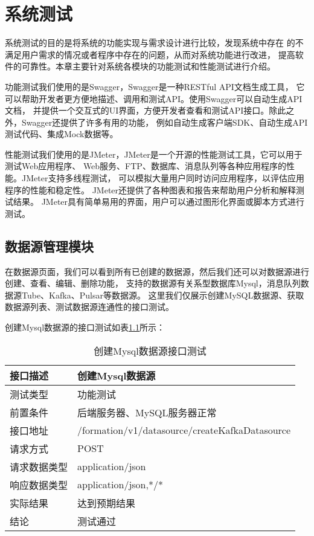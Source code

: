 
\chapter{系统测试}

系统测试的目的是将系统的功能实现与需求设计进行比较，发现系统中存在
的不满足用户需求的情况或者程序中存在的问题，从而对系统功能进行改进，
提高软件的可靠性。本章主要针对系统各模块的功能测试和性能测试进行介绍\cite{32}。

功能测试我们使用的是Swagger，Swagger是一种RESTful API文档生成工具，
它可以帮助开发者更方便地描述、调用和测试API。使用Swagger可以自动生成API文档，
并提供一个交互式的UI界面，方便开发者查看和测试API接口。除此之外，Swagger还提供了许多有用的功能，
例如自动生成客户端SDK、自动生成API测试代码、集成Mock数据等。

性能测试我们使用的是JMeter，JMeter是一个开源的性能测试工具，它可以用于测试Web应用程序、
Web服务、FTP、数据库、消息队列等各种应用程序的性能。JMeter支持多线程测试，
可以模拟大量用户同时访问应用程序，以评估应用程序的性能和稳定性。
JMeter还提供了各种图表和报告来帮助用户分析和解释测试结果。
JMeter具有简单易用的界面，用户可以通过图形化界面或脚本方式进行测试。

\section{数据源管理模块}

在数据源页面，我们可以看到所有已创建的数据源，然后我们还可以对数据源进行创建、查看、编辑、删除功能，
支持的数据源有关系型数据库Mysql，消息队列数据源Tube、Kafka、Pulsar等数据源。
这里我们仅展示创建MySQL数据源、获取数据源列表、测试数据源连通性的接口测试。

创建Mysql数据源的接口测试如表\ref{tab:exampletable1}所示：

\begin{table}[H]
  \centering
  \caption{创建Mysql数据源接口测试}
  \label{tab:exampletable1}
  \begin{tabular}{ll}
    \toprule
    接口描述         & 创建Mysql数据源          \\
    \midrule
    测试类型         & 功能测试         \\
    前置条件         & 后端服务器、MySQL服务器正常         \\
    接口地址       & /formation/v1/datasource/createKafkaDatasource         \\
    请求方式         & POST      \\
    请求数据类型         & application/json     \\
    响应数据类型         & application/json,*/*           \\
    实际结果         & 达到预期结果           \\
    结论            & 测试通过           \\
    \bottomrule
  \end{tabular}
\end{table}

